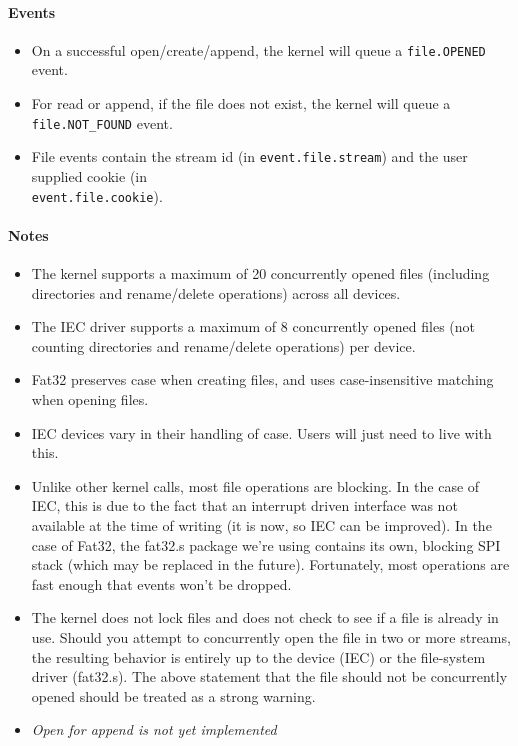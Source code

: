\paragraph{Events}
\begin{itemize}
\item On a successful open/create/append, the kernel will queue a \verb+file.OPENED+ event.
\item For read or append, if the file does not exist, the kernel will queue a \verb+file.NOT_FOUND+ event.
\item File events contain the stream id (in \verb+event.file.stream+) and the user supplied cookie (in\\ \verb+event.file.cookie+).
\end{itemize}

\paragraph{Notes}
\begin{itemize}
\item The kernel supports a maximum of 20 concurrently opened files (including directories and rename/delete operations) across all devices.
\item The IEC driver supports a maximum of 8 concurrently opened files (not counting directories and rename/delete operations) per device. 
\item Fat32 preserves case when creating files, and uses case-insensitive matching when opening files.
\item IEC devices vary in their handling of case.  Users will just need to live with this.
\item Unlike other kernel calls, most file operations are blocking.  In the case of IEC, this is due to the fact that an interrupt driven interface was not available at the time of writing (it is now, so IEC can be improved).  In the case of Fat32, the fat32.s package we're using contains its own, blocking SPI stack (which may be replaced in the future).  Fortunately, most operations are fast enough that events won't be dropped.
\item The kernel does not lock files and does not check to see if a file is already in use.  Should you attempt to concurrently open the file in two or more streams, the resulting behavior is entirely up to the device (IEC) or the file-system driver (fat32.s).  The above statement that the file should not be concurrently opened should be treated as a strong warning. 
\item {\em Open for append is not yet implemented}
\end{itemize}


